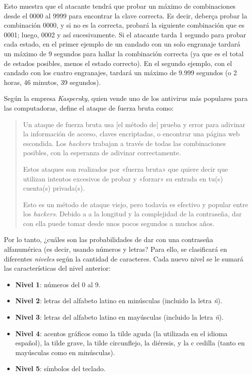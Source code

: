 \documentclass[12pt,a4paper,twoside]{book}
\begin{document}
Esto muestra que el atacante tendrá que probar un máximo de combinaciones desde el 0000 al 9999 para encontrar la clave correcta. Es decir, deberça probar la combinación 0000, y si no es la correcta, probará la siguiente combinación que es 0001; luego, 0002 y así sucesivamente. Si el atacante tarda 1 segundo para probar cada estado, en el primer ejemplo de un candado con un solo engranaje tardará un máximo de 9 segundos para hallar la combinación correcta (ya que es el total de estados posibles, menos el estado correcto). En el segundo ejemplo, con el candado con los cuatro engranajes, tardará un máximo de 9.999 segundos (o 2 horas, 46 minutos, 39 segundos).

Según la empresa \textit{Kaspersky}, quien vende uno de los antivirus más populares para las computadoras, define el ataque de fuerza bruta como:

\begin{quotation}
Un ataque de fuerza bruta usa [el método de] prueba y error para adivinar la información de acceso, claves encriptadas, o encontrar una página web escondida. Los \textit{hackers} trabajan a través de todas las combinaciones posibles, con la esperanza de adivinar correctamente.

Estos ataques son realizados por «fuerza bruta» que quiere decir que utilizan intentos excesivos de probar y «forzar» su entrada en tu(s) cuenta(s) privada(s).

Esto es un método de ataque viejo, pero todavía es efectivo y popular entre los \textit{hackers}. Debido a a la longitud y la complejidad de la contraseña, dar con ella puede tomar desde unos pocos segundos a muchos años. \cite{kaspersky}
\end{quotation}

Por lo tanto, ¿cuáles son las probabilidades de dar con una contraseña alfanumérica (es decir, usando números y letras? Para ello, se clasificará en diferentes \textit{niveles} según la cantidad de caracteres. Cada nuevo nivel se le sumará las características del nivel anterior:

\begin{itemize}
\item \textbf{Nivel 1}: números del 0 al 9.
\item \textbf{Nivel 2}: letras del alfabeto latino en minúsculas (incluido la letra \textit{ñ}).
\item \textbf{Nivel 3}: letras del alfabeto latino en mayúsculas (incluido la letra \textit{ñ}).
\item \textbf{Nivel 4}: acentos gráficos como la tilde aguda (la utilizada en el idioma español), la tilde grave, la tilde circunflejo, la diéresis, y la c cedilla (tanto en mayúsculas como en minúsculas).
\item \textbf{Nivel 5}: símbolos del teclado.
\end{itemize}
\end{document}

